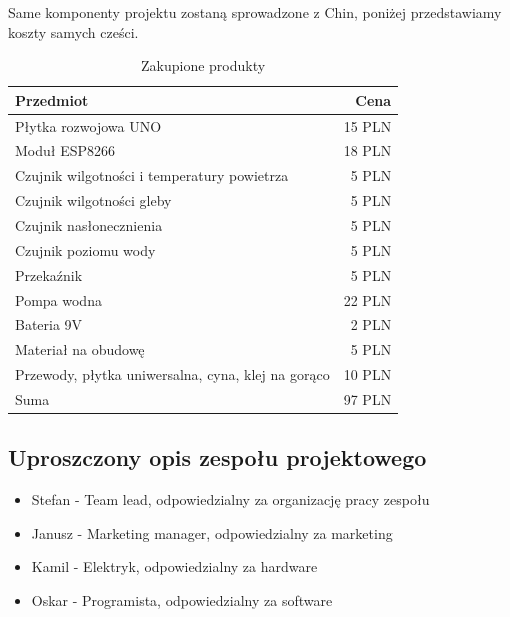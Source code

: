 \documentclass[12pt]{article}
\begin{document}
Same komponenty projektu zostaną sprowadzone z Chin, poniżej przedstawiamy koszty samych cześci.

\begin{table}[!h]
	\centering
	\begin{tabular}{l|r}
		Przedmiot & Cena \\\hline
		
		Płytka rozwojowa UNO & 15 PLN \\
		
		Moduł ESP8266 & 18 PLN \\
		
		Czujnik wilgotności i temperatury powietrza & 5 PLN \\
		
		Czujnik wilgotności gleby & 5 PLN \\
		
		Czujnik nasłonecznienia & 5 PLN \\
		
		Czujnik poziomu wody & 5 PLN \\
		
		Przekaźnik & 5 PLN \\
		
		Pompa wodna & 22 PLN \\
		
		Bateria 9V & 2 PLN \\
		
		Materiał na obudowę & 5 PLN \\
		
		Przewody, płytka uniwersalna, cyna, klej na gorąco & 10 PLN 
		\\ \hline
		Suma & 97 PLN
		
	\end{tabular}
	\caption{\label{tab:widgets}Zakupione produkty}
\end{table}


\subsection{Uproszczony opis zespołu projektowego}

\begin{itemize}
	
\item Stefan - Team lead, odpowiedzialny za organizację pracy zespołu

\item Janusz - Marketing manager, odpowiedzialny za marketing 

\item Kamil - Elektryk, odpowiedzialny za hardware

\item Oskar - Programista, odpowiedzialny za software




\end{itemize}
\end{document}
